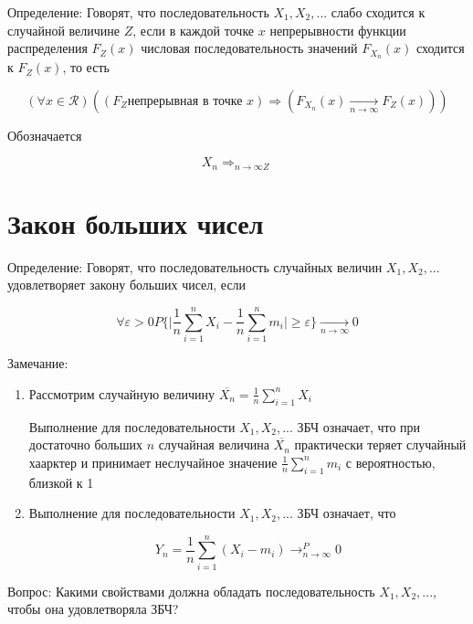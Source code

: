 Определение: Говорят, что последовательность $X_1, X_2,...$ слабо сходится к случайной величине $Z$, если в каждой точке $x$ непрерывности функции распределения $F_Z(x)$ числовая последовательность значений $F_{X_n}(x)$ сходится к $F_Z(x)$, то есть

\begin{equation*}
(\forall x \in \mathcal R) (( F_Z \text{непрерывная в точке } x ) \Rightarrow (F_{X_n} (x) \xrightarrow[n\to\infty]{} F_Z(x)))
\end{equation*}

Обозначается

\begin{equation*}
    X_n \Rightarrow_{n\to\infty Z}
\end{equation*}

\section{Закон больших чисел}

Определение: Говорят, что последовательность случайных величин $X_1,X_2,...$ удовлетворяет закону больших чисел, если

\begin{equation*}
    \forall \varepsilon > 0 P\{ \bigg|\frac{1}{n} \sum_{i=1}^n X_i - \frac{1}{n} \sum_{i=1}^n m_i\bigg| \geq \varepsilon \} \xrightarrow[n\to\infty]{} 0
\end{equation*}

Замечание:

\begin{enumerate}
    \item Рассмотрим случайную величину $\overline{X_n} = \frac{1}{n} \sum_{i=1}^n X_i$

        Выполнение для последовательности $X_1, X_2,...$ ЗБЧ означает, что при достаточно больших $n$ случайная величина $\overline{X_n}$ практически теряет случайный хаарктер и принимает неслучайное значение $\frac{1}{n} \sum_{i=1}^n m_i$ с вероятностью, близкой к 1

    \item Выполнение для последовательности $X_1,X_2,...$ ЗБЧ означает, что

        \begin{equation*}
            Y_n = \frac{1}{n} \sum_{i=1}^n (X_i - m_i) \to_{n\to\infty}^P 0
        \end{equation*}
\end{enumerate}

Вопрос: Какими свойствами должна обладать последовательность $X_1,X_2,...$, чтобы она удовлетворяла ЗБЧ?

